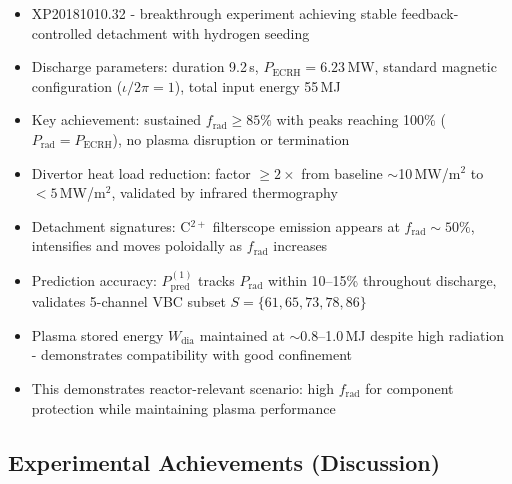 \documentclass[11pt,a4paper]{article}
\begin{document}
\begin{itemize}
\item XP20181010.32 - breakthrough experiment achieving stable feedback-controlled detachment with hydrogen seeding
\item Discharge parameters: duration 9.2\,s, $P_{\text{ECRH}}=6.23$\,MW, standard magnetic configuration ($\iota/2\pi=1$), total input energy 55\,MJ
\item Key achievement: sustained $f_{\text{rad}}\geq85\%$ with peaks reaching 100\% ($P_{\text{rad}}=P_{\text{ECRH}}$), no plasma disruption or termination
\item Divertor heat load reduction: factor $\geq2\times$ from baseline $\sim$10\,MW/m$^2$ to $<5$\,MW/m$^2$, validated by infrared thermography
\item Detachment signatures: C$^{2+}$ filterscope emission appears at $f_{\text{rad}}\sim50\%$, intensifies and moves poloidally as $f_{\text{rad}}$ increases
\item Prediction accuracy: $P_{\text{pred}}^{(1)}$ tracks $P_{\text{rad}}$ within 10--15\% throughout discharge, validates 5-channel VBC subset $S=\{61,65,73,78,86\}$
\item Plasma stored energy $W_{\text{dia}}$ maintained at $\sim$0.8--1.0\,MJ despite high radiation - demonstrates compatibility with good confinement
\item This demonstrates reactor-relevant scenario: high $f_{\text{rad}}$ for component protection while maintaining plasma performance
\end{itemize}

\subsection{Experimental Achievements (Discussion)}
\end{document}
